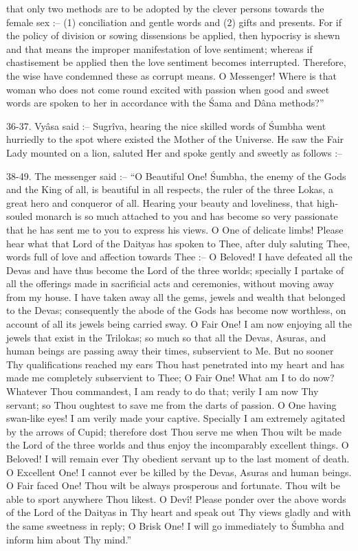that only two methods are to be adopted by the clever persons towards the female sex :-- (1) conciliation and gentle words and (2) gifts and presents. For if the policy of division or sowing dissensions be applied, then hypocrisy is shewn and that means the improper manifestation of love sentiment; whereas if chastisement be applied then the love sentiment becomes interrupted. Therefore, the wise have condemned these as corrupt means. O Messenger! Where is that woman who does not come round excited with passion when good and sweet words are spoken to her in accordance with the \'Sama and D\^ana methods?''

36-37. Vy\^asa said :-- Sugr\^iva, hearing the nice skilled words of \'Sumbha went hurriedly to the spot where existed the Mother of the Universe. He saw the Fair Lady mounted on a lion, saluted Her and spoke gently and sweetly as follows :--

38-49. The messenger said :-- ``O Beautiful One! \'Sumbha, the enemy of the Gods and the King of all, is beautiful in all respects, the ruler of the three Lokas, a great hero and conqueror of all. Hearing your beauty and loveliness, that high-souled monarch is so much attached to you and has become so very passionate that he has sent me to you to express his views. O One of delicate limbs! Please hear what that Lord of the Daityas has spoken to Thee, after duly saluting Thee, words full of love and affection towards Thee :-- O Beloved! I have defeated all the Devas and have thus become the Lord of the three worlds; specially I partake of all the offerings made in sacrificial acts and ceremonies, without moving away from my house. I have taken away all the gems, jewels and wealth that belonged to the Devas; consequently the abode of the Gods has become now worthless, on account of all its jewels being carried sway. O Fair One! I am now enjoying all the jewels that exist in the Trilokas; so much so that all the Devas, Asuras, and human beings are passing away their times, subservient to Me. But no sooner Thy qualifications reached my ears Thou hast penetrated into my heart and has made me completely subservient to Thee; O Fair One! What am I to do now? Whatever Thou commandest, I am ready to do that; verily I am now Thy servant; so Thou oughtest to save me from the darts of passion. O One having swan-like eyes! I am verily made your captive. Specially I am extremely agitated by the arrows of Cupid; therefore dost Thou serve me when Thou wilt be made the Lord of the three worlds and thus enjoy the incomparably excellent things. O Beloved! I will remain ever Thy obedient servant up to the last moment of death. O Excellent One! I cannot ever be killed by the Devas, Asuras and human beings. O Fair faced One! Thou wilt be always prosperous and fortunate. Thou wilt be able to sport anywhere Thou likest. O Dev\^i! Please ponder over the above words of the Lord of the Daityas in Thy heart and speak out Thy views gladly and with the same sweetness in reply; O Brisk One! I will go immediately to \'Sumbha and inform him about Thy mind.''

